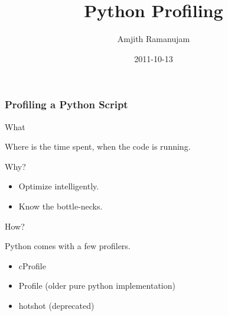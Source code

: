\documentclass[t,english]{beamer}
\begin{document}
\title[Python Profiling]{Python Profiling%
  \label{python-profiling}}
\author[Amjith Ramanujam]{Amjith Ramanujam}
\date{2011-10-13}
\maketitle















\begin{frame}[fragile]
\frametitle{Profiling a Python Script}


\begin{block}{ What }

Where is the time spent, when the code is running.

\end{block}

\pause

\begin{block}{ Why? }
\begin{itemize}

\item Optimize intelligently.

\item Know the bottle-necks.
\end{itemize}

\end{block}

\pause

\begin{block}{ How? }

Python comes with a few profilers.
\begin{itemize}

\item cProfile

\item Profile  (older pure python implementation)

\item hotshot  (deprecated)
\end{itemize}

\end{block}
\end{frame}
\end{document}

